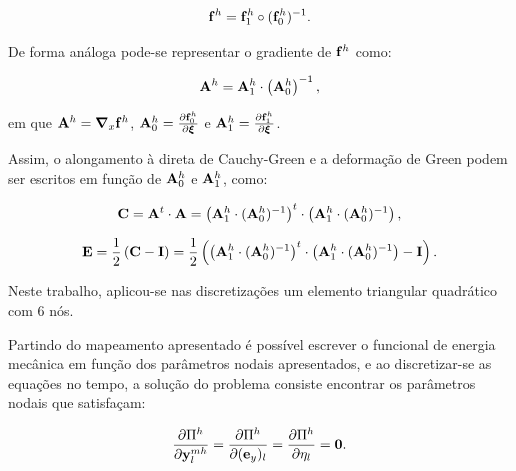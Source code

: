 \documentclass[tese_patricia]{subfiles}
\begin{document}
\begin{align}
	\mathbf{f}^{h} = \mathbf{f}^{h}_{1} \circ  (\mathbf{f}^{h}_{0})^{-1} \label{eq:eq_mud_conf}.
\end{align}

De forma análoga pode-se representar o gradiente de  $\mathbf{f}^{h}$ como:

\begin{align}
\mathbf{A}^{h} = \mathbf{A}^{h}_{1} \cdot \left(\mathbf{A}^{h}_{0}\right)^{-1} \label{eq:gradDeformation},
\end{align}

\noindent em que $\mathbf{A}^{h} = \boldsymbol{\nabla}_x \mathbf{f}^{h}$, $\mathbf{A}^{h}_{0} = \frac{\partial  \mathbf{f}^{h}_{0}} {\partial \boldsymbol{\xi}}$ e  $\mathbf{A}^{h}_{1} =  \frac{\partial  \mathbf{f}^{h}_{1}} {\partial \boldsymbol{\xi}}$.

Assim, o alongamento à direta de Cauchy-Green e a deformação de Green podem ser escritos em função de $\mathbf{A}^{h}_{0}$ e $\mathbf{A}^{h}_{1}$, como:

\begin{align}
	\mathbf{C} = \mathbf{A}^{t} \cdot \mathbf{A} = \left(\mathbf{A}^{h}_{1} \cdot (\mathbf{A}^{h}_{0})^{-1}\right)^{t} \cdot \left(\mathbf{A}^{h}_{1} \cdot (\mathbf{A}^{h}_{0})^{-1}\right),
\end{align}

\begin{align}
	\mathbf{E} = \frac{1}{2}\left(\mathbf{C} - \mathbf{I}\right) = \frac{1}{2}\left(\left(\mathbf{A}^{h}_{1} \cdot (\mathbf{A}^{h}_{0})^{-1}\right)^{t} \cdot \left(\mathbf{A}^{h}_{1} \cdot (\mathbf{A}^{h}_{0})^{-1}\right) - \mathbf{I}\right).
\end{align}

Neste trabalho, aplicou-se nas discretizações um elemento triangular quadrático com 6 nós.

Partindo do mapeamento apresentado é possível escrever o funcional de energia mecânica em função dos parâmetros nodais apresentados, e ao discretizar-se as equações no tempo, a solução do problema consiste encontrar os parâmetros nodais que satisfaçam:

\begin{align}
	\frac{\partial\Pi^{h}}{\partial \mathbf{y}_{l}^{mh}} = \frac{\partial\Pi^{h}}{\partial (\mathbf{e}_y)_l} = \frac{\partial\Pi^{h}}{\partial \eta_l} = \mathbf{0}.
\end{align}
\end{document}

